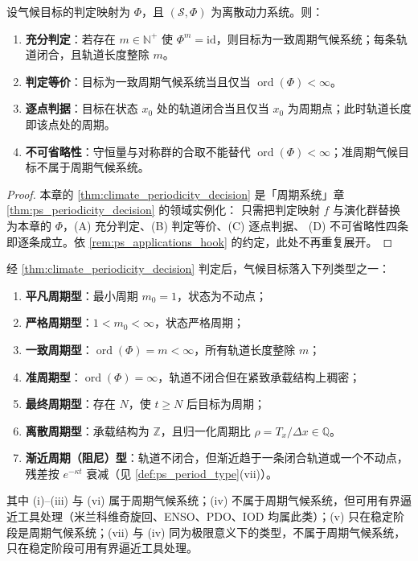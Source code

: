 \begin{theorem}[气候周期性判定定理]\label{thm:climate_periodicity_decision}
设气候目标的判定映射为 $\Phi$，且 $(\mathcal S,\Phi)$ 为离散动力系统。则：
\begin{enumerate}[label=(\Alph*)]
    \item \textbf{充分判定}：若存在 $m\in\mathbb N^+$ 使 $\Phi^m=\mathrm{id}$，则目标为一致周期气候系统；每条轨道闭合，且轨道长度整除 $m$。
    \item \textbf{判定等价}：目标为一致周期气候系统当且仅当 $\operatorname{ord}(\Phi)<\infty$。
    \item \textbf{逐点判据}：目标在状态 $x_0$ 处的轨道闭合当且仅当 $x_0$ 为周期点；此时轨道长度即该点处的周期。
    \item \textbf{不可省略性}：守恒量与对称群的合取不能替代 $\operatorname{ord}(\Phi)<\infty$；准周期气候目标不属于周期气候系统。
\end{enumerate}
\end{theorem}

\begin{proof}
本章的 \cref{thm:climate_periodicity_decision} 是「周期系统」章 \cref{thm:ps_periodicity_decision} 的领域实例化：
只需把判定映射 $f$ 与演化群替换为本章的 $\Phi$，(A) 充分判定、(B) 判定等价、(C) 逐点判据、
(D) 不可省略性四条即逐条成立。依 \cref{rem:ps_applications_hook} 的约定，此处不再重复展开。
\end{proof}

\begin{corollary}[气候周期类型]\label{cor:climate_period_type}
经 \cref{thm:climate_periodicity_decision} 判定后，气候目标落入下列类型之一：
\begin{enumerate}[label=(\roman*)]
    \item \textbf{平凡周期型}：最小周期 $m_0=1$，状态为不动点；
    \item \textbf{严格周期型}：$1<m_0<\infty$，状态严格周期；
    \item \textbf{一致周期型}：$\operatorname{ord}(\Phi)=m<\infty$，所有轨道长度整除 $m$；
    \item \textbf{准周期型}：$\operatorname{ord}(\Phi)=\infty$，轨道不闭合但在紧致承载结构上稠密；
    \item \textbf{最终周期型}：存在 $N$，使 $t\ge N$ 后目标为周期；
    \item \textbf{离散周期型}：承载结构为 $\mathbb Z$，且归一化周期比 $\rho=T_x/\Delta x\in\mathbb Q$。
    \item \textbf{渐近周期（阻尼）型}：轨道不闭合，但渐近趋于一条闭合轨道或一个不动点，残差按 $e^{-\kappa t}$ 衰减（见 \cref{def:ps_period_type}(vii)）。
\end{enumerate}
其中 (i)--(iii) 与 (vi) 属于周期气候系统；(iv) 不属于周期气候系统，但可用有界逼近工具处理（米兰科维奇旋回、ENSO、PDO、IOD 均属此类）；(v) 只在稳定阶段是周期气候系统；(vii) 与 (iv) 同为极限意义下的类型，不属于周期气候系统，只在稳定阶段可用有界逼近工具处理。
\end{corollary}


